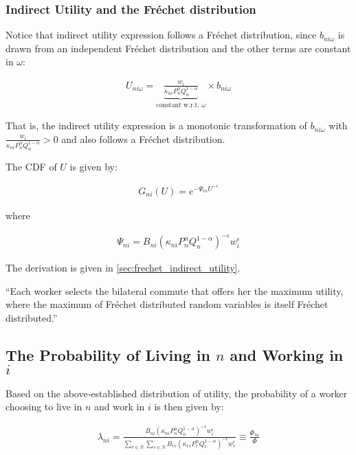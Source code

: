 \documentclass[10pt]{article}
\begin{document}
\subsubsection{Indirect Utility and the Fréchet distribution}

Notice that indirect utility expression follows a Fréchet distribution,
since $b_{n i \omega}$ is drawn from an independent Fréchet distribution
and the other terms are constant in $\omega$:

\begin{align}
    U_{n i \omega}=\underbrace{\frac{w_i}{\kappa_{n i} P_n^\alpha Q_n^{1-\alpha}}}_{\text {constant w.r.t. } \omega} \times b_{n i \omega}
\end{align}

That is, the indirect utility expression is a monotonic 
transformation of $b_{n i \omega}$ with $\frac{w_i}{\kappa_{n i} P_n^\alpha Q_n^{1-\alpha}} > 0$ and also 
follows a Fréchet distribution.

The CDF of $U$ is given by:

\begin{align}
    G_{n i}(U)=e^{-\Psi_{n i} U^{-\epsilon}} \label{eq:frechet_indirect_utility}
\end{align}

where 

\begin{align}
    \Psi_{n i}=B_{n i}\left(\kappa_{n i} P_n^\alpha Q_n^{1-\alpha}\right)^{-\epsilon} w_i^\epsilon
\end{align}

The derivation is given in \autoref{sec:frechet_indirect_utility}.

``Each worker selects the
bilateral commute that offers her the maximum utility, where the maximum of
Fréchet distributed random variables is itself Fréchet distributed.''

\subsection{The Probability of Living in $n$ and Working in $i$}

Based on the above-established distribution of utility, 
the probability of a worker choosing to live in $n$ 
and work in $i$ is then given by:

\begin{align}
    \lambda_{n i}=\frac{B_{n i}\left(\kappa_{n i} P_n^\alpha Q_n^{1-\alpha}\right)^{-\epsilon} w_i^\epsilon}{\sum_{r \in N} \sum_{s \in N} B_{r s}\left(\kappa_{r s} P_r^\alpha Q_r^{1-\alpha}\right)^{-\epsilon} w_s^\epsilon} \equiv \frac{\Phi_{n i}}{\Phi} \label{eq:lambda_ni_1}
\end{align}
\end{document}
